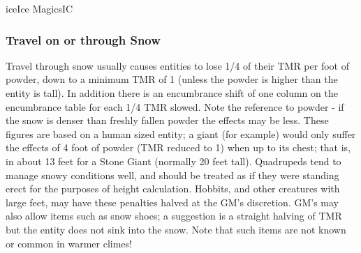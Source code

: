\begin{college}[1.5]{ice}{Ice Magics}{IC}
\subsubsection{Travel on or through Snow}
\label{ice:travel:snow}

Travel through snow usually causes entities to lose 1/4 of their TMR
per foot of powder, down to a minimum TMR of 1 (unless the powder is
higher than the entity is tall).  In addition there is an encumbrance
shift of one column on the encumbrance table for each 1/4 TMR slowed.
Note the reference to powder - if the snow is denser than freshly
fallen powder the effects may be less.  These figures are based on a
human sized entity; a giant (for example) would only suffer the
effects of 4 foot of powder (TMR reduced to 1) when up to its chest;
that is, in about 13 feet for a Stone Giant (normally 20 feet tall).
Quadrupeds tend to manage snowy conditions well, and should be treated
as if they were standing erect for the purposes of height calculation.
Hobbits, and other creatures with large feet, may have these penalties
halved at the GM's discretion.  GM's may also allow items such as snow
shoes; a suggestion is a straight halving of TMR but the entity does
not sink into the snow.  Note that such items are not known or common
in warmer climes!
\end{college}
